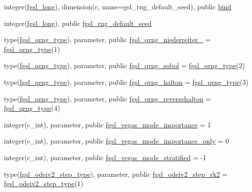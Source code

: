 \begin{DoxyCompactItemize}
\item 
integer(\hyperlink{namespacefgsl_a22fca1111887118eb07d5f9688ea38ad}{fgsl\+\_\+long}), dimension(c, name=\textquotesingle{}gsl\+\_\+rng\+\_\+default\+\_\+seed\textquotesingle{}), public \hyperlink{namespacefgsl_a64406a5e119fa92e47b1adcddb152e91}{bind}
\item 
integer(\hyperlink{namespacefgsl_a22fca1111887118eb07d5f9688ea38ad}{fgsl\+\_\+long}), public \hyperlink{namespacefgsl_a26af265921be65d7d401bd4865dfe221}{fgsl\+\_\+rng\+\_\+default\+\_\+seed}
\item 
type(\hyperlink{structfgsl_1_1fgsl__qrng__type}{fgsl\+\_\+qrng\+\_\+type}), parameter, public \hyperlink{namespacefgsl_a3b034ddb20e620b652a5fe35050c0beb}{fgsl\+\_\+qrng\+\_\+niederreiter\+\_} = \hyperlink{structfgsl_1_1fgsl__qrng__type}{fgsl\+\_\+qrng\+\_\+type}(1)
\item 
type(\hyperlink{structfgsl_1_1fgsl__qrng__type}{fgsl\+\_\+qrng\+\_\+type}), parameter, public \hyperlink{namespacefgsl_ae1c1dcc2273c7307b2f972c9f04ab69f}{fgsl\+\_\+qrng\+\_\+sobol} = \hyperlink{structfgsl_1_1fgsl__qrng__type}{fgsl\+\_\+qrng\+\_\+type}(2)
\item 
type(\hyperlink{structfgsl_1_1fgsl__qrng__type}{fgsl\+\_\+qrng\+\_\+type}), parameter, public \hyperlink{namespacefgsl_a0d865a8d73c002f671f6e1bc1727966c}{fgsl\+\_\+qrng\+\_\+halton} = \hyperlink{structfgsl_1_1fgsl__qrng__type}{fgsl\+\_\+qrng\+\_\+type}(3)
\item 
type(\hyperlink{structfgsl_1_1fgsl__qrng__type}{fgsl\+\_\+qrng\+\_\+type}), parameter, public \hyperlink{namespacefgsl_a871225c291532b659185f193d97a976a}{fgsl\+\_\+qrng\+\_\+reversehalton} = \hyperlink{structfgsl_1_1fgsl__qrng__type}{fgsl\+\_\+qrng\+\_\+type}(4)
\item 
integer(c\+\_\+int), parameter, public \hyperlink{namespacefgsl_a40718f473b729ccccca99b83b15569f1}{fgsl\+\_\+vegas\+\_\+mode\+\_\+importance} = 1
\item 
integer(c\+\_\+int), parameter, public \hyperlink{namespacefgsl_a8b3b603c4ff1fa9726169eaeb1617cf4}{fgsl\+\_\+vegas\+\_\+mode\+\_\+importance\+\_\+only} = 0
\item 
integer(c\+\_\+int), parameter, public \hyperlink{namespacefgsl_a03809231ad730f80ecda79c11940298e}{fgsl\+\_\+vegas\+\_\+mode\+\_\+stratified} = -\/1
\item 
type(\hyperlink{structfgsl_1_1fgsl__odeiv2__step__type}{fgsl\+\_\+odeiv2\+\_\+step\+\_\+type}), parameter, public \hyperlink{namespacefgsl_a3f76db1b3a7cdaa6b00e64515d6641b0}{fgsl\+\_\+odeiv2\+\_\+step\+\_\+rk2} = \hyperlink{structfgsl_1_1fgsl__odeiv2__step__type}{fgsl\+\_\+odeiv2\+\_\+step\+\_\+type}(1)

\end{DoxyCompactItemize}
